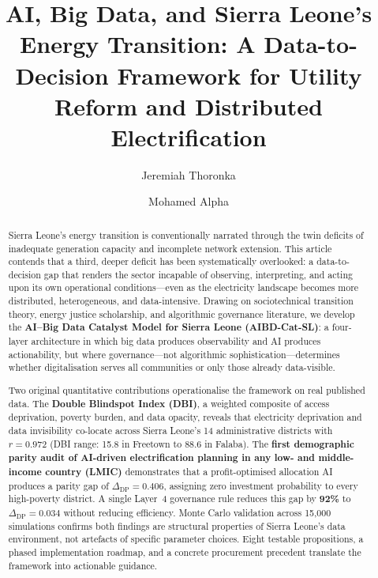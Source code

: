 \documentclass[preprint,12pt]{elsarticle}
\begin{document}
\begin{frontmatter}

\title{AI, Big Data, and Sierra Leone's Energy Transition:
       A Data-to-Decision Framework for Utility Reform
       and Distributed Electrification}

\author[tu]{Jeremiah Thoronka}

\author[cmu]{Mohamed Alpha}

\address[tu]{School of Global Studies, Thammasat University,
             Bangkok, Thailand}
\address[cmu]{Carnegie Mellon University Africa, Kigali, Rwanda}

\begin{abstract}
Sierra Leone's energy transition is conventionally narrated through
the twin deficits of inadequate generation capacity and incomplete
network extension. This article contends that a third, deeper deficit
has been systematically overlooked: a data-to-decision gap that
renders the sector incapable of observing, interpreting, and acting
upon its own operational conditions---even as the electricity
landscape becomes more distributed, heterogeneous, and data-intensive.
Drawing on sociotechnical transition theory, energy justice
scholarship, and algorithmic governance literature, we develop the
\textbf{AI--Big Data Catalyst Model for Sierra Leone (AIBD-Cat-SL)}:
a four-layer architecture in which big data produces observability
and AI produces actionability, but where governance---not
algorithmic sophistication---determines whether digitalisation serves
all communities or only those already data-visible.

Two original quantitative contributions operationalise the framework
on real published data. The \textbf{Double Blindspot Index (DBI)},
a weighted composite of access deprivation, poverty burden, and data
opacity, reveals that electricity deprivation and data invisibility
co-locate across Sierra Leone's 14 administrative districts with
$r = 0.972$ (DBI range: 15.8 in Freetown to 88.6 in Falaba). The
\textbf{first demographic parity audit of AI-driven electrification
planning in any low- and middle-income country (LMIC)} demonstrates
that a profit-optimised allocation AI produces a parity gap of
$\Delta_{\mathrm{DP}} = 0.406$, assigning zero investment probability
to every high-poverty district. A single Layer~4 governance rule
reduces this gap by \textbf{92\%} to $\Delta_{\mathrm{DP}} = 0.034$
without reducing efficiency. Monte Carlo validation across 15,000
simulations confirms both findings are structural properties of
Sierra Leone's data environment, not artefacts of specific
parameter choices. Eight testable propositions, a phased
implementation roadmap, and a concrete procurement precedent
translate the framework into actionable guidance.
\end{abstract}


\end{frontmatter}
\end{document}
